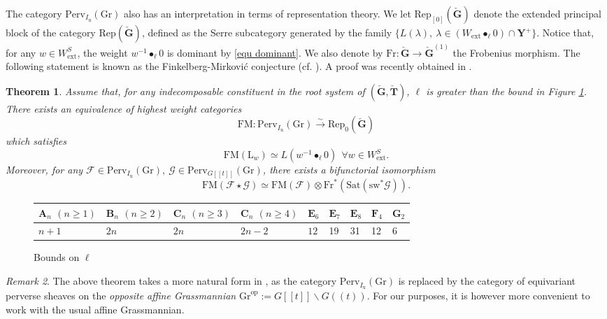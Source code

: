 \documentclass[11pt]{amsart}
\theoremstyle{plain}
\newtheorem{thm}{Theorem}[section]
\theoremstyle{remark}
\newtheorem{rem}[thm]{Remark}
\numberwithin{equation}{section}
\begin{document}
	The category $\mathrm{Perv}_{I_\mathrm{u}}(\mathrm{Gr})$ also has an interpretation in terms of representation theory. We let $\mathrm{Rep}_{[0]}(\check{\mathbf{G}})$ denote the extended principal block of the category $\mathrm{Rep}(\check{\mathbf{G}})$, defined as the Serre subcategory generated by the family $\{L(\lambda),~\lambda\in (W_{\mathrm{ext}}\bullet_\ell 0)\cap\mathbf{Y}^+\}$. Notice that, for any $w\in W^S_\mathrm{ext}$, the weight $w^{-1}\bullet_\ell0$ is dominant by \eqref{equ dominant}. We also denote by $\mathrm{Fr}:\check{\mathbf{G}}\to \check{\mathbf{G}}^{(1)}$ the Frobenius morphism. The following statement is known as the Finkelberg-Mirkovi\'c conjecture (cf. \cite[§1.5]{finkelberg1997semiinfinite}). A proof was recently obtained in \cite{bezrukavnikov2024modular}.
	\begin{thm}\label{Thm FM}
		Assume that, for any indecomposable constituent in the root system of $(\check{\mathbf{G}},\check{\mathbf{T}})$, $\ell$ is greater than the bound in Figure \ref{figure 1}. There exists an equivalence of highest weight categories
		$$\mathrm{FM}:\mathrm{Perv}_{I_\mathrm{u}}(\mathrm{Gr})\xrightarrow{\sim} \mathrm{Rep}_0(\check{\mathbf{G}}) $$
		which satisfies
		$$\mathrm{FM}(\mathrm{L}_w)\simeq L(w^{-1}\bullet_\ell0)~~\forall  w\in W^S_\mathrm{ext}.$$
		Moreover, for any $\mathcal{F}\in \mathrm{Perv}_{I_\mathrm{u}}(\mathrm{Gr}),~\mathcal{G}\in \mathrm{Perv}_{G[[t]]}(\mathrm{Gr})$, there exists a bifunctorial isomorphism
		$$\mathrm{FM}(\mathcal{F}\star \mathcal{G})\simeq \mathrm{FM}(\mathcal{F})\otimes \mathrm{Fr}^*(\mathrm{Sat}(\mathrm{sw}^*\mathcal{G})).$$
	\end{thm}
 \begin{figure}\label{figure 1}\begin{tabular}{|l|l|l|l|l|l|l|l|l|}
				\hline
				$\mathbf{A}_n$ $(n\geq1)$ & $\mathbf{B}_n$ $(n\geq2)$ & $\mathbf{C}_n$ $(n\geq3)$ & $\mathbf{C}_n$ $(n\geq4)$ & $\mathbf{E}_6$ &$\mathbf{E}_7$ &$\mathbf{E}_8$ &$\mathbf{F}_4$ & $\mathbf{G}_2$\\ \hline
				$n+1$ & $2n$ & $2n$ & $2n-2$ & $12$ &19 &31 &12 &6 \\
				\hline
		\end{tabular}\caption{Bounds on $\ell$}\label{figure 1}\end{figure}
 \begin{rem}
     The above theorem takes a more natural form in \cite{bezrukavnikov2024modular}, as the category $\mathrm{Perv}_{I_\mathrm{u}}(\mathrm{Gr})$ is replaced by the category of equivariant perverse sheaves on the \textit{opposite affine Grassmannian} $\mathrm{Gr}^{\mathrm{op}}:=G[[t]]\backslash G((t))$. For our purposes, it is however more convenient to work with the usual affine Grassmannian.  
 \end{rem}
\end{document}
